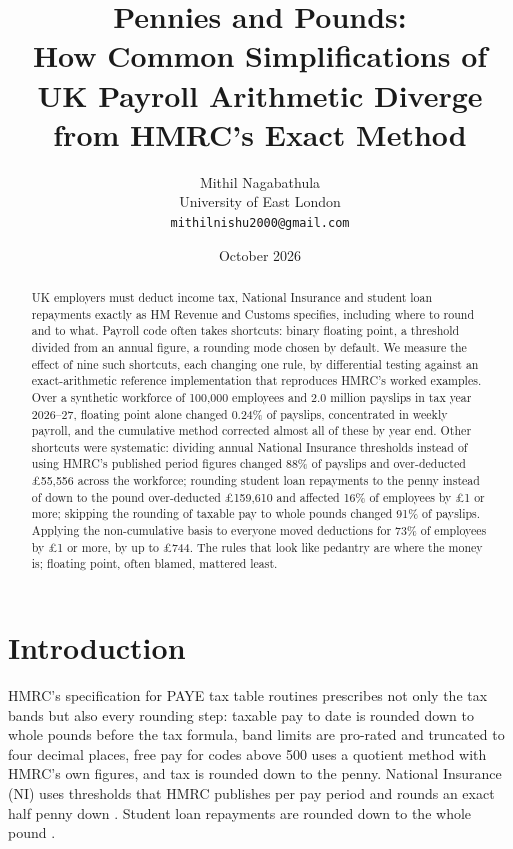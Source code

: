 \documentclass[11pt]{article}
\title{Pennies and Pounds:\\
\large How Common Simplifications of UK Payroll Arithmetic Diverge from HMRC's Exact Method}
\author{Mithil Nagabathula\\University of East London\\\texttt{mithilnishu2000@gmail.com}}
\date{October 2026}
\begin{document}
\maketitle

\begin{abstract}
UK employers must deduct income tax, National Insurance and student loan repayments exactly as HM Revenue and Customs specifies,
including where to round and to what. Payroll code often takes shortcuts: binary floating point, a threshold divided from an annual
figure, a rounding mode chosen by default. We measure the effect of nine such shortcuts, each changing one rule, by differential testing
against an exact-arithmetic reference implementation that reproduces HMRC's worked examples. Over a synthetic workforce of 100{,}000
employees and 2.0 million payslips in tax year 2026--27, floating point alone changed 0.24\% of payslips, concentrated in weekly payroll,
and the cumulative method corrected almost all of these by year end. Other shortcuts were systematic: dividing annual National Insurance
thresholds instead of using HMRC's published period figures changed 88\% of payslips and over-deducted \pounds55{,}556 across the
workforce; rounding student loan repayments to the penny instead of down to the pound over-deducted \pounds159{,}610 and affected 16\% of
employees by \pounds1 or more; skipping the rounding of taxable pay to whole pounds changed 91\% of payslips. Applying the
non-cumulative basis to everyone moved deductions for 73\% of employees by \pounds1 or more, by up to \pounds744. The rules that look
like pedantry are where the money is; floating point, often blamed, mattered least.
\end{abstract}

\section{Introduction}
HMRC's specification for PAYE tax table routines \cite{hmrc2026spec} prescribes not only the tax bands but also every rounding step: taxable
pay to date is rounded down to whole pounds before the tax formula, band limits are pro-rated and truncated to four decimal places, free
pay for codes above 500 uses a quotient method with HMRC's own figures, and tax is rounded down to the penny. National Insurance (NI) uses
thresholds that HMRC publishes per pay period and rounds an exact half penny down \cite{hmrc2026rates}. Student loan repayments are
rounded down to the whole pound \cite{hmrc2026sl}.
\end{document}
